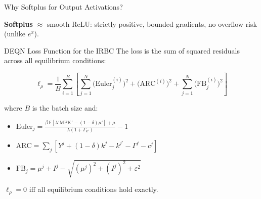 \documentclass[aspectratio=169,11pt]{beamer}
\newcommand{\emphc}[1]{\textcolor{harvardcrimson}{#1}}
\newcommand{\E}[1]{\mathbb{E}\!\left[#1\right]}
\begin{document}
\begin{frame}{Why Softplus for Output Activations?}
\begin{center}
\end{center}

\vspace{0.2em}
{\small
\textbf{Softplus} $\approx$ smooth ReLU: strictly positive, bounded gradients, no overflow risk (unlike $e^x$).
}
\end{frame}

\begin{frame}{DEQN Loss Function for the IRBC}
The loss is the \emphc{sum of squared residuals} across all equilibrium conditions:

\[
\boxed{
\ell_\rho = \frac{1}{B}\sum_{i=1}^{B} \left[\sum_{j=1}^{N} \bigl(\text{Euler}_j^{(i)}\bigr)^2 + \bigl(\text{ARC}^{(i)}\bigr)^2 + \sum_{j=1}^{N} \bigl(\text{FB}_j^{(i)}\bigr)^2\right]
}
\]

\vspace{0.3em}
where $B$ is the batch size and:
\begin{itemize}
    \item $\text{Euler}_j = \frac{\beta\,\E{\lambda' \text{MPK}' - (1-\delta)\mu'} + \mu}{\lambda(1+\Gamma_{k'})} - 1$
    \item $\text{ARC} = \sum_j [Y^j + (1-\delta)k^j - k^{j\prime} - \Gamma^j - c^j]$
    \item $\text{FB}_j = \mu^j + I^j - \sqrt{(\mu^j)^2 + (I^j)^2 + \varepsilon^2}$
\end{itemize}

\vspace{0.3em}
$\ell_\rho = 0$ iff all equilibrium conditions hold exactly.
\end{frame}
\end{document}
